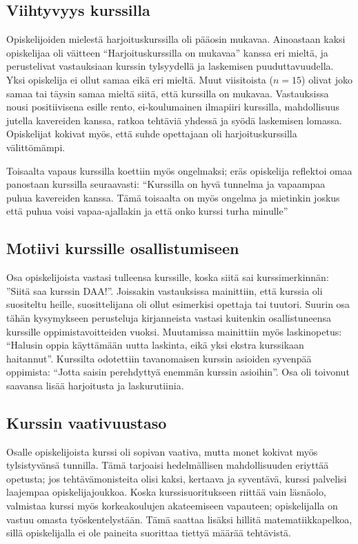 \subsection{Viihtyvyys kurssilla}
Opiskelijoiden mielestä harjoituskurssilla oli pääosin mukavaa. Ainoastaan kaksi opiskelijaa oli väitteen ``Harjoituskurssilla on mukavaa'' kanssa eri mieltä, ja perustelivat vastauksiaan kurssin tylsyydellä ja laskemisen puuduttavuudella. Yksi opiskelija ei ollut samaa eikä eri mieltä. Muut viisitoista ($n=15$) olivat joko samaa tai täysin samaa mieltä siitä, että kurssilla on mukavaa. Vastauksissa nousi positiivisena esille rento, ei-koulumainen ilmapiiri kurssilla, mahdollisuus jutella kavereiden kanssa, ratkoa tehtäviä yhdessä ja syödä laskemisen lomassa. Opiskelijat kokivat myös, että suhde opettajaan oli harjoituskurssilla välittömämpi. 

Toisaalta vapaus kurssilla koettiin myös ongelmaksi; eräs opiskelija reflektoi omaa panostaan kurssilla seuraavasti: ``Kurssilla on hyvä tunnelma ja vapaampaa puhua kavereiden kanssa. Tämä toisaalta on myös ongelma ja mietinkin joskus että puhua voisi vapaa-ajallakin ja että onko kurssi turha minulle''

\subsection{Motiivi kurssille osallistumiseen}
Osa opiskelijoista vastasi tulleensa kurssille, koska siitä sai kurssimerkinnän: ''Siitä saa kurssin DAA!''. Joissakin vastauksissa mainittiin, että kurssia oli suositeltu heille, suosittelijana oli ollut esimerkisi opettaja tai tuutori. Suurin osa tähän kysymykseen perusteluja kirjanneista vastasi kuitenkin osallistuneensa kurssille oppimistavoitteiden vuoksi. Muutamissa mainittiin myös laskinopetus: ``Halusin oppia käyttämään uutta laskinta, eikä yksi ekstra kurssikaan haitannut''. Kurssilta odotettiin tavanomaisen kurssin asioiden syvenpää oppimista: ``Jotta saisin perehdyttyä enemmän kurssin asioihin''. Osa oli toivonut saavansa lisää harjoitusta ja laskurutiinia. 

\subsection{Kurssin vaativuustaso}
Osalle opiskelijoista kurssi oli sopivan vaativa, mutta monet kokivat myös tylsistyvänsä tunnilla.
Tämä tarjoaisi hedelmällisen mahdollisuuden eriyttää opetusta; jos tehtävämonisteita olisi kaksi, kertaava ja syventävä, kurssi palvelisi laajempaa opiskelijajoukkoa.
Koska kurssisuoritukseen riittää vain läsnäolo, valmistaa kurssi myös korkeakoulujen akateemiseen vapauteen; opiskelijalla on vastuu omasta työskentelystään.
Tämä saattaa lisäksi hillitä matematiikkapelkoa, sillä opiskelijalla ei ole paineita suorittaa tiettyä määrää tehtävistä. 

